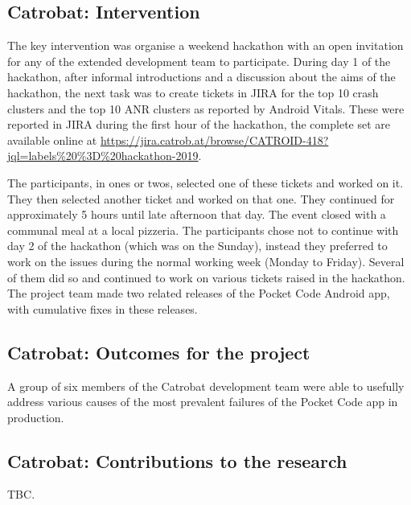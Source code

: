 
\subsection{Catrobat: Intervention}
The key intervention was organise a weekend hackathon with an open invitation for any of the extended development team to participate. During day 1 of the hackathon, after informal introductions and a discussion about the aims of the hackathon, the next task was to create tickets in JIRA for the top 10 crash clusters and the top 10 ANR clusters as reported by Android Vitals. These were reported in JIRA during the first hour of the hackathon, the complete set are available online at \url{https://jira.catrob.at/browse/CATROID-418?jql=labels\%20\%3D\%20hackathon-2019}. 

The participants, in ones or twos, selected one of these tickets and worked on it. They then selected another ticket and worked on that one. They continued for approximately 5 hours until late afternoon that day. The event closed with a communal meal at a local pizzeria. The participants chose not to continue with day 2 of the hackathon (which was on the Sunday), instead they preferred to work on the issues during the normal working week (Monday to Friday). Several of them did so and continued to work on various tickets raised in the hackathon. The project team made two related releases of the Pocket Code Android app, with cumulative fixes in these releases.

\subsection{Catrobat: Outcomes for the project}
A group of six members of the Catrobat development team were able to usefully address various causes of the most prevalent failures of the Pocket Code app in production. 

\subsection{Catrobat: Contributions to the research}
TBC.

